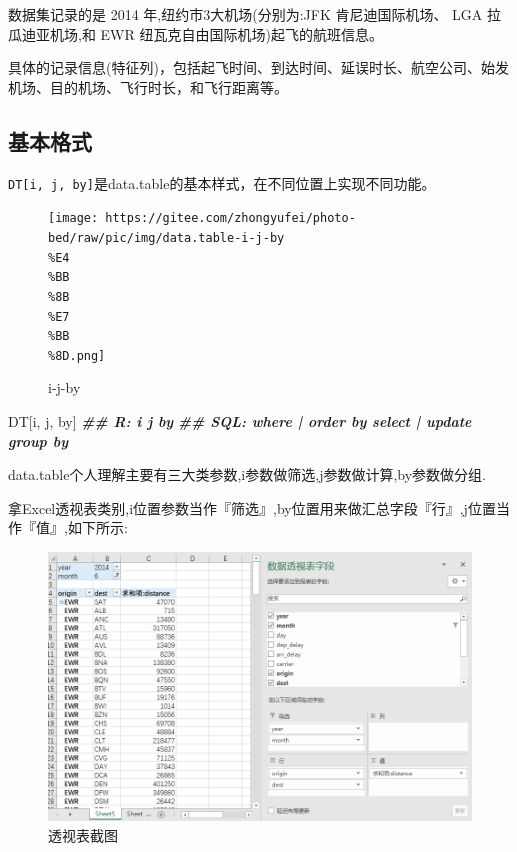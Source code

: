 \documentclass[
]{book}
\newenvironment{Shaded}{\begin{snugshade}}{\end{snugshade}}
\newcommand{\DocumentationTok}[1]{\textcolor[rgb]{0.56,0.35,0.01}{\textbf{\textit{#1}}}}
\newcommand{\NormalTok}[1]{#1}
\begin{document}
数据集记录的是 2014 年,纽约市3大机场(分别为:JFK 肯尼迪国际机场、 LGA 拉瓜迪亚机场,和 EWR 纽瓦克自由国际机场)起飞的航班信息。

具体的记录信息(特征列)，包括起飞时间、到达时间、延误时长、航空公司、始发机场、目的机场、飞行时长，和飞行距离等。

\hypertarget{ux57faux672cux683cux5f0f}{%
\subsection{基本格式}\label{ux57faux672cux683cux5f0f}}

\texttt{DT{[}i,\ j,\ by{]}}是data.table的基本样式，在不同位置上实现不同功能。

\begin{figure}
\centering
\texttt{[image: https://gitee.com/zhongyufei/photo-bed/raw/pic/img/data.table-i-j-by\\\%E4\\\%BB\\\%8B\\\%E7\\\%BB\\\%8D.png]}
\caption{i-j-by}
\end{figure}

\begin{Shaded}
\begin{Highlighting}[]
\NormalTok{DT[i, j, by]}
\DocumentationTok{\#\#   R:                 i                 j        by}
\DocumentationTok{\#\# SQL:  where | order by   select | update  group by}
\end{Highlighting}
\end{Shaded}

data.table个人理解主要有三大类参数,i参数做筛选,j参数做计算,by参数做分组.

拿Excel透视表类别,i位置参数当作『筛选』,by位置用来做汇总字段『行』,j位置当作『值』,如下所示:

\begin{figure}
\centering
\includegraphics{./picture/data-table/01picture.png}
\caption{透视表截图}
\end{figure}
\end{document}
